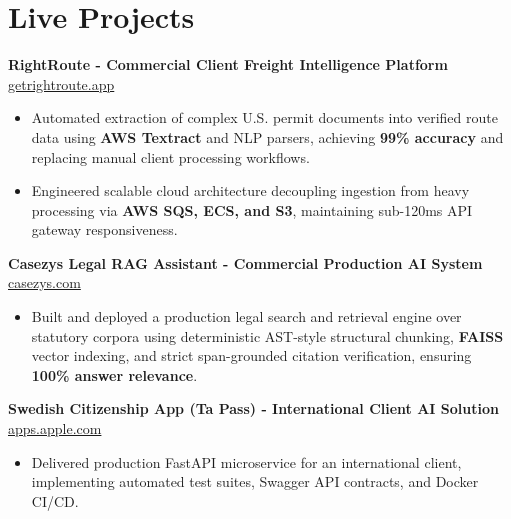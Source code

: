\documentclass[9.5pt,a4paper]{article}
\begin{document}
\section*{Live Projects}
\noindent
\textbf{RightRoute - Commercial Client Freight Intelligence Platform} \hfill \href{https://getrightroute.app}{getrightroute.app}
\begin{itemize}
    \item Automated extraction of complex U.S. permit documents into verified route data using \textbf{AWS Textract} and NLP parsers, achieving \textbf{99\% accuracy} and replacing manual client processing workflows.
    \item Engineered scalable cloud architecture decoupling ingestion from heavy processing via \textbf{AWS SQS, ECS, and S3}, maintaining sub-120ms API gateway responsiveness.
\end{itemize}
\vspace{0.6pt}
\noindent
\textbf{Casezys Legal RAG Assistant - Commercial Production AI System} \hfill \href{https://casezys.com}{casezys.com}
\begin{itemize}
    \item Built and deployed a production legal search and retrieval engine over statutory corpora using deterministic AST-style structural chunking, \textbf{FAISS} vector indexing, and strict span-grounded citation verification, ensuring \textbf{100\% answer relevance}.
\end{itemize}
\vspace{0.6pt}
\noindent
\textbf{Swedish Citizenship App (Ta Pass) - International Client AI Solution} \hfill \href{https://apps.apple.com/us/app/ta-pass-swedish-citizenship/id6799644651}{apps.apple.com}
\begin{itemize}
    \item Delivered production FastAPI microservice for an international client, implementing automated test suites, Swagger API contracts, and Docker CI/CD.
\end{itemize}
\vspace{0.6pt}
\end{document}
